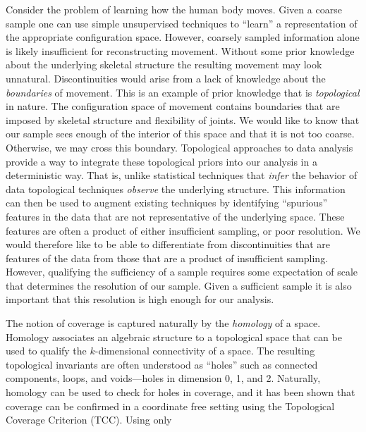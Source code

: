 Consider the problem of learning how the human body moves.
Given a coarse sample one can use simple unsupervised techniques to ``learn'' a representation of the appropriate configuration space.
However, coarsely sampled information alone is likely insufficient for reconstructing movement.
Without some prior knowledge about the underlying skeletal structure the resulting movement may look unnatural.
Discontinuities would arise from a lack of knowledge about the \emph{boundaries} of movement.
This is an example of prior knowledge that is \emph{topological} in nature.
The configuration space of movement contains boundaries that are imposed by skeletal structure and flexibility of joints.
We would like to know that our sample sees enough of the interior of this space and that it is not too coarse.
Otherwise, we may cross this boundary.
Topological approaches to data analysis provide a way to integrate these topological priors into our analysis in a deterministic way.
That is, unlike statistical techniques that \emph{infer} the behavior of data topological techniques \emph{observe} the underlying structure.
This information can then be used to augment existing techniques by identifying ``spurious'' features in the data that are not representative of the underlying space.
These features are often a product of either insufficient sampling, or poor resolution.
We would therefore like to be able to differentiate from discontinuities that are features of the data from those that are a product of insufficient sampling.
However, qualifying the sufficiency of a sample requires some expectation of scale that determines the resolution of our sample.
Given a sufficient sample it is also important that this resolution is high enough for our analysis.

The notion of coverage is captured naturally by the \emph{homology} of a space.
Homology associates an algebraic structure to a topological space that can be used to qualify the $k$-dimensional connectivity of a space.
The resulting topological invariants are often understood as ``holes'' such as connected components, loops, and voids---holes in dimension 0, 1, and 2.
Naturally, homology can be used to check for holes in coverage, and it has been shown that coverage can be confirmed in a coordinate free setting using the Topological Coverage Criterion (TCC).
Using only




